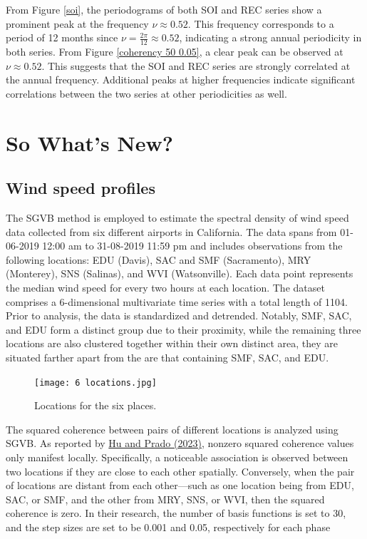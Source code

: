 \documentclass[12pt,a4paper]{article}
\begin{document}
From Figure \ref{soi}, the periodograms of both SOI and REC series show a prominent peak at the frequency $\nu \approx 0.52$. This frequency corresponds to a period of 12 months since $\nu = \frac{2\pi}{12}\approx 0.52$, indicating a strong annual periodicity in both series. From Figure \ref{coherency 50 0.05}, a clear peak can be observed at $\nu\approx 0.52$. This suggests that the SOI and REC series are strongly correlated at the annual frequency. Additional peaks at higher frequencies indicate significant correlations between the two series at other periodicities as well.







\section{So What's New?}
\label{sec:whatsnew}
\subsection{Wind speed profiles}
The SGVB method is employed to estimate the spectral density of wind speed data collected from six different airports in California. The data spans from 01-06-2019 12:00 am to 31-08-2019 11:59 pm and includes observations from the following locations: EDU (Davis), SAC and SMF (Sacramento), MRY (Monterey), SNS (Salinas), and WVI (Watsonville). Each data point represents the median wind speed for every two hours at each location. The dataset comprises a 6-dimensional multivariate time series with a total length of 1104. Prior to analysis, the data is standardized and detrended. Notably, SMF, SAC, and EDU form a distinct group due to their proximity, while the remaining three locations are also clustered together within their own distinct area, they are situated farther apart from the are that containing SMF, SAC, and EDU.
\begin{figure}[H]
\centering
\texttt{[image: 6 locations.jpg]}
\caption{Locations for the six places.}
\end{figure}

The squared coherence between pairs of different locations is analyzed using SGVB. As reported by \hyperref[hu2023]{Hu and Prado (2023)}, nonzero squared coherence values only manifest locally. Specifically, a noticeable association is observed between two locations if they are close to each other spatially. Conversely, when the pair of locations are distant from each other—such as one location being from EDU, SAC, or SMF, and the other from MRY, SNS, or WVI, then the squared coherence is zero. In their research, the number of basis functions is set to 30, and the step sizes are set to be 0.001 and 0.05, respectively for each phase
\end{document}
